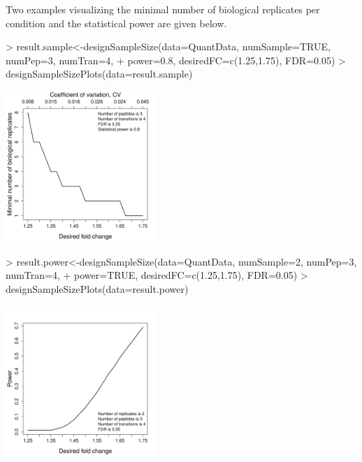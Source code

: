 \documentclass[11pt]{article}
\begin{document}
Two examples visualizing the minimal number of biological replicates per condition and the statistical power are given below.
\begin{small}
\begin{Schunk}
\begin{Sinput}
> result.sample<-designSampleSize(data=QuantData, numSample=TRUE, numPep=3, numTran=4,
+                                 power=0.8, desiredFC=c(1.25,1.75), FDR=0.05)
> designSampleSizePlots(data=result.sample)
\end{Sinput}
\end{Schunk}
\end{small}


\begin{center}
\includegraphics[width=2.25in]{SampleSizeReplicateYeast.pdf}\\
\end{center}

\begin{small}
\begin{Schunk}
\begin{Sinput}
> result.power<-designSampleSize(data=QuantData, numSample=2, numPep=3, numTran=4,
+                                power=TRUE, desiredFC=c(1.25,1.75), FDR=0.05)
> designSampleSizePlots(data=result.power)
\end{Sinput}
\end{Schunk}
\end{small}

\begin{center}
\includegraphics[width=2.25in]{power.pdf}\\
\end{center}
\end{document}
